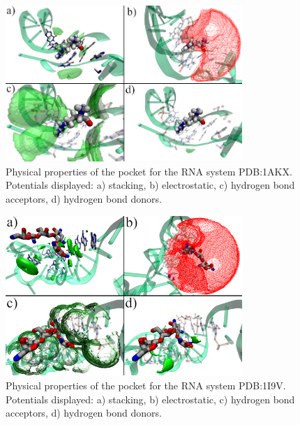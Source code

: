 \begin{figure}[H]
  \centering
  \includegraphics[width=0.8\textwidth]{figures/appendix/benchmark_rna/1akx.png}
  \caption{\label{fig:appx_benchmark/1akx} Physical properties of the pocket for the RNA system PDB:1AKX. Potentials displayed: a) stacking, b) electrostatic, c) hydrogen bond acceptors, d) hydrogen bond donors.}
\end{figure}

\begin{figure}[H]
  \centering
  \includegraphics[width=0.8\textwidth]{figures/appendix/benchmark_rna/1i9v.png}
  \caption{\label{fig:appx_benchmark/1i9v} Physical properties of the pocket for the RNA system PDB:1I9V. Potentials displayed: a) stacking, b) electrostatic, c) hydrogen bond acceptors, d) hydrogen bond donors.}
\end{figure}

